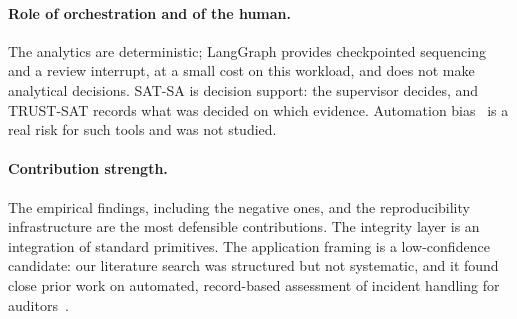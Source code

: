 \paragraph{Role of orchestration and of the human.}
The analytics are deterministic; LangGraph provides checkpointed sequencing and a
review interrupt, at a small cost on this workload, and does not make analytical
decisions. SAT-SA is decision support: the supervisor decides, and TRUST-SAT records
what was decided on which evidence. Automation bias~\cite{parasuraman2010automation}
is a real risk for such tools and was not studied.

\paragraph{Contribution strength.}
The empirical findings, including the negative ones, and the reproducibility
infrastructure are the most defensible contributions. The integrity layer is an
integration of standard primitives. The application framing is a low-confidence
candidate: our literature search was structured but not systematic, and it found
close prior work on automated, record-based assessment of incident handling for
auditors~\cite{palma2024compliance}.
